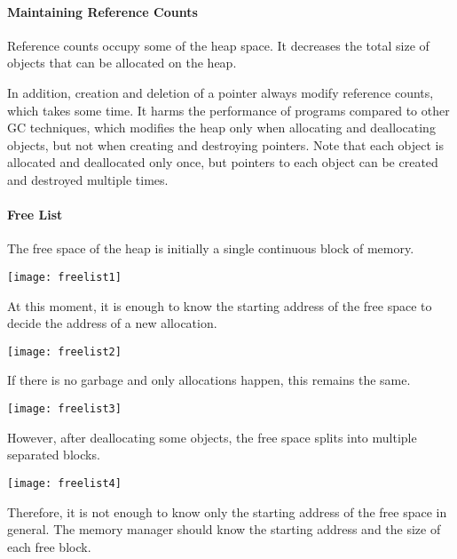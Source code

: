 \paragraph{Maintaining Reference Counts}

Reference counts occupy some of the heap space. It decreases the total size of
objects that can be allocated on the heap.

In addition, creation and deletion of a pointer always modify reference counts,
which takes some time. It harms the performance of programs compared to other GC
techniques, which modifies the heap only when allocating and deallocating
objects, but not when creating and destroying pointers. Note that each object is
allocated and deallocated only once, but pointers to each object can be created
and destroyed multiple times.

\paragraph{Free List}

The free space of the heap is initially a single continuous block of memory.

\begin{center}
\texttt{[image: freelist1]}
\end{center}

At this moment, it is enough to know the starting address of the free space to
decide the address of a new allocation.

\begin{center}
\texttt{[image: freelist2]}
\end{center}

If there is no garbage and only allocations happen, this remains the same.

\begin{center}
\texttt{[image: freelist3]}
\end{center}

However, after deallocating some objects, the free space splits into multiple
separated blocks.

\begin{center}
\texttt{[image: freelist4]}
\end{center}

Therefore, it is not enough to know only the starting address of the free space
in general. The memory manager should know the starting address and the size of
each free block.

